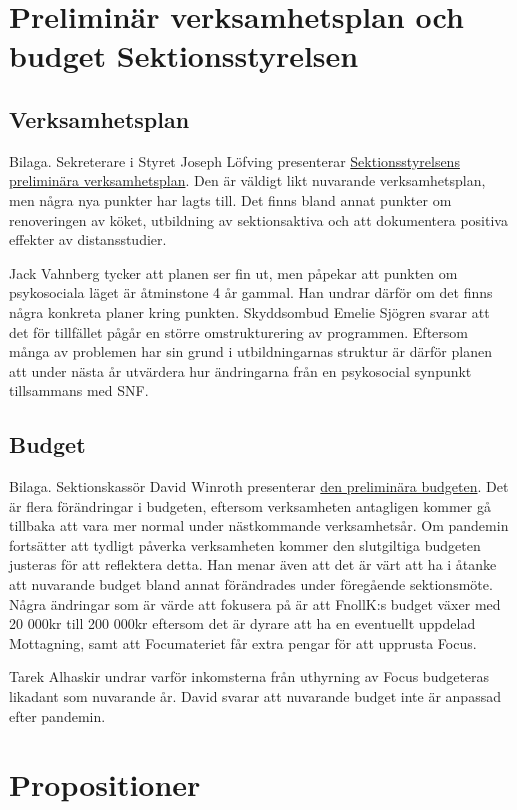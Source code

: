 \documentclass[hidelinks]{sektionsmote}
\begin{document}
\section{Preliminär verksamhetsplan och budget Sektionsstyrelsen}

\subsection{Verksamhetsplan}
Bilaga.
Sekreterare i Styret Joseph Löfving presenterar \hyperlink{bilagor/pvp.pdf.1}{Sektionsstyrelsens preliminära verksamhetsplan}.
Den är väldigt likt nuvarande verksamhetsplan, men några nya punkter har lagts till.
Det finns bland annat punkter om renoveringen av köket, utbildning av sektionsaktiva och att dokumentera positiva effekter av distansstudier.

Jack Vahnberg tycker att planen ser fin ut, men påpekar att punkten om psykosociala läget är åtminstone 4 år gammal.
Han undrar därför om det finns några konkreta planer kring punkten.
Skyddsombud Emelie Sjögren svarar att det för tillfället pågår en större omstrukturering av programmen.
Eftersom många av problemen har sin grund i utbildningarnas struktur är därför planen att under nästa år utvärdera hur ändringarna från en psykosocial synpunkt tillsammans med SNF.

\subsection{Budget}
Bilaga.
Sektionskassör David Winroth presenterar \hyperlink{bilagor/budget.pdf.1}{den preliminära budgeten}.
Det är flera förändringar i budgeten, eftersom verksamheten antagligen kommer gå tillbaka att vara mer normal under nästkommande verksamhetsår.
Om pandemin fortsätter att tydligt påverka verksamheten kommer den slutgiltiga budgeten justeras för att reflektera detta.
Han menar även att det är värt att ha i åtanke att nuvarande budget bland annat förändrades under föregående sektionsmöte.
Några ändringar som är värde att fokusera på är att FnollK:s budget växer med 20 000kr till 200 000kr eftersom det är dyrare att ha en eventuellt uppdelad Mottagning, samt att Focumateriet får extra pengar för att upprusta Focus.

Tarek Alhaskir undrar varför inkomsterna från uthyrning av Focus budgeteras likadant som nuvarande år.
David svarar att nuvarande budget inte är anpassad efter pandemin.


\section{Propositioner}
\end{document}
